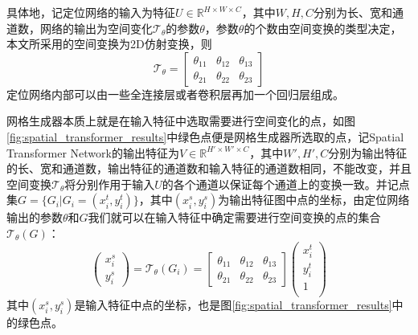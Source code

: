 具体地，记定位网络的输入为特征$U\in \mathbb{R}^{H\times W\times C}$，其中$W,H,C$分别为长、宽和通道数，网络的输出为空间变化$\mathcal{T}_{\theta}$的参数$\theta$，参数$\theta$的个数由空间变换的类型决定，本文所采用的空间变换为2D仿射变换，则
\begin{equation}
  \mathcal{T}_\theta = \left[
    \begin{array}{ccc}
      \theta_{11}&\theta_{12}&\theta_{13}\\
      \theta_{21}&\theta_{22}&\theta_{23}
    \end{array}
    \right]
\end{equation}
定位网络内部可以由一些全连接层或者卷积层再加一个回归层组成。

网格生成器本质上就是在输入特征中选取需要进行空间变化的点，如图\ref{fig:spatial_transformer_results}中绿色点便是网格生成器所选取的点，记Spatial Transformer Network的输出特征为$V\in \mathbb{R}^{H'\times W'\times C}$，其中$W',H',C$分别为输出特征的长、宽和通道数，输出特征的通道数和输入特征的通道数相同，不能改变，并且空间变换$\mathcal{T}_{\theta}$将分别作用于输入$U$的各个通道以保证每个通道上的变换一致。并记点集$G = \{G_i|G_i = (x^t_i, y^t_i)\}$，其中$(x_i^s, y_i^s)$为输出特征图中点的坐标，由定位网络输出的参数$\theta$和$G$我们就可以在输入特征中确定需要进行空间变换的点的集合$\mathcal{T}_\theta(G)$：
\begin{equation}
  \left(
    \begin{array}{c}
      x_i^s\\
      y_i^s
    \end{array}
  \right) = \mathcal{T}_\theta(G_i) =
  \left[
    \begin{array}{ccc}
    \theta_{11}&\theta_{12}&\theta_{13}\\
    \theta_{21}&\theta_{22}&\theta_{23}
    \end{array}
  \right]
  \left(
    \begin{array}{c}
      x_i^t\\
      y_i^t\\
      1\\
    \end{array}
  \right)
\end{equation}
其中$(x_i^s, y_i^s)$是输入特征中点的坐标，也是图\ref{fig:spatial_transformer_results}中的绿色点。

